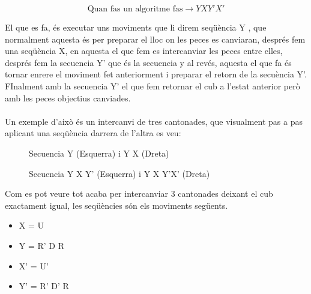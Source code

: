 $$ \textrm{Quan fas un algoritme fas} \rightarrow Y X Y' X' $$

El que es fa, és executar uns moviments que li direm seqüència Y , que normalment aquesta és per preparar el lloc on les peces es canviaran, després fem una seqüència X, en aquesta el que fem es intercanviar les peces entre elles, després fem la secuencia Y' que és la secuencia y al revés, aquesta el que fa és tornar enrere el moviment fet anteriorment i preparar el retorn de la secuència Y'. FInalment amb la secuencia Y' el que fem retornar el cub a l'estat anterior però amb les peces objectius canviades.
\\\\Un exemple d'això és un intercanvi de tres cantonades, que visualment pas a pas aplicant una seqüència darrera de l'altra es veu:

\begin{figure}[htbp]
    \centering
    \begin{subfigure}
        \centering\RubikCubeSolvedWY
    \end{subfigure}
    \begin{subfigure}
        \centering\RubikCubeSolvedWY
    \end{subfigure}
    \caption{Secuencia Y (Esquerra) i Y X (Dreta)}
\end{figure}

\begin{figure}[htbp]
    \centering
    \begin{subfigure}
        \centering\RubikCubeSolvedWY
    \end{subfigure}
    \begin{subfigure}
        \centering\RubikCubeSolvedWY
    \end{subfigure}
    \caption{Secuencia Y X Y' (Esquerra) i Y X Y'X' (Dreta)}
\end{figure}

Com es pot veure tot acaba per intercanviar 3 cantonades deixant el cub exactament igual, les seqüències són els moviments següents.
\begin{itemize}
    \item X = U
    \item Y = R' D R
    \item X' = U'
    \item Y' = R' D' R
\end{itemize}

